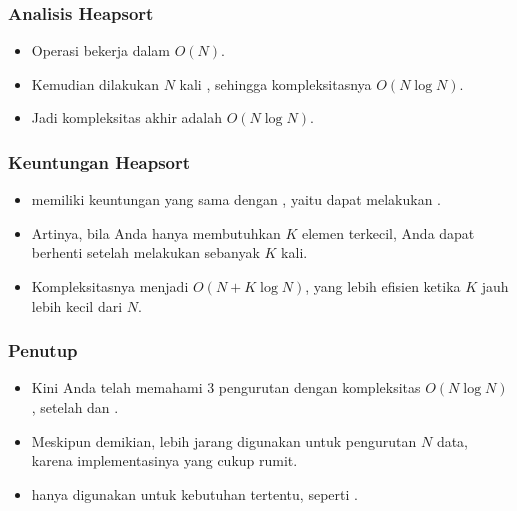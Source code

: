 \begin{frame}
\frametitle{Analisis Heapsort}
\begin{itemize}
  \item Operasi  bekerja dalam $O(N)$.
  \item Kemudian dilakukan $N$ kali , sehingga kompleksitasnya $O(N\log{N})$.
  \item Jadi kompleksitas akhir \pheapsort adalah $O(N\log{N})$.
\end{itemize}
\end{frame}

\begin{frame}
\frametitle{Keuntungan Heapsort}
\begin{itemize}
  \item \pHeapsort memiliki keuntungan yang sama dengan , yaitu dapat melakukan .
  \item Artinya, bila Anda hanya membutuhkan $K$ elemen terkecil, Anda dapat berhenti setelah melakukan  sebanyak $K$ kali.
  \item Kompleksitasnya menjadi $O(N + K \log{N})$, yang lebih efisien ketika $K$ jauh lebih kecil dari $N$.
\end{itemize}
\end{frame}

\begin{frame}
\frametitle{Penutup}
\begin{itemize}
  \item Kini Anda telah memahami 3 pengurutan dengan kompleksitas $O(N \log{N})$, setelah  dan .
  \item Meskipun demikian, \pheapsort lebih jarang digunakan untuk pengurutan $N$ data, karena implementasinya yang cukup rumit.
  \item \pHeapsort hanya digunakan untuk kebutuhan tertentu, seperti .
\end{itemize}
\end{frame}


